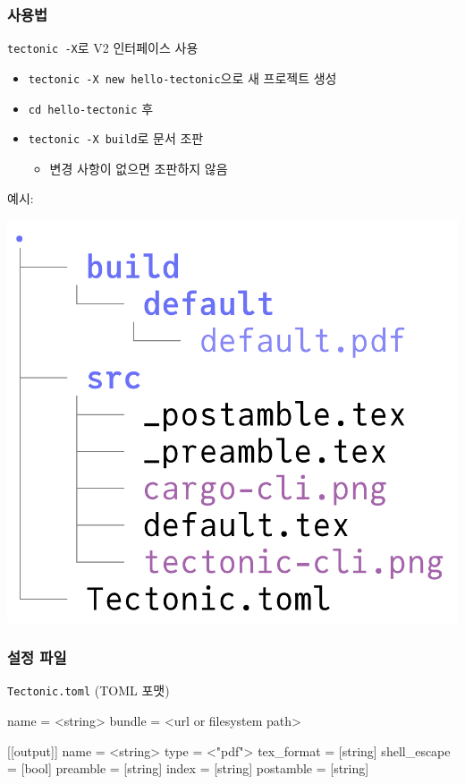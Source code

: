 \begin{frame}[c,fragile]
  \frametitle{사용법}

  \verb/tectonic -X/로 V2 인터페이스 사용

  \begin{itemize}
    \item \verb/tectonic -X new hello-tectonic/으로 새 프로젝트 생성
    \item \verb/cd hello-tectonic/ 후
    \item \verb/tectonic -X build/로 문서 조판
      \begin{itemize}
        \item 변경 사항이 없으면 조판하지 않음
      \end{itemize}
  \end{itemize}

  예시:
  \begin{center}
    \includegraphics[width=0.4\linewidth]{tree.png}
  \end{center}
\end{frame}

\begin{frame}[c,fragile]
  \frametitle{설정 파일}
  \verb/Tectonic.toml/ (TOML 포맷)
  \begin{tomlcode}
[doc]
name = <string>
bundle = <url or filesystem path>

[[output]]
name = <string>
type = <"pdf">
tex_format = [string]
shell_escape = [bool]
preamble = [string]
index = [string]
postamble = [string]
  \end{tomlcode}
\end{frame}

